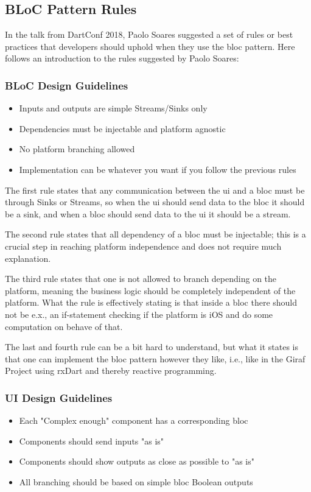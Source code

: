 \subsection{BLoC Pattern Rules}
In the talk from DartConf 2018, Paolo Soares suggested a set of rules or best practices that developers should uphold when they use the \gls{bloc} pattern. Here follows an introduction to the rules suggested by Paolo Soares:

\subsubsection{BLoC Design Guidelines}
\begin{itemize}
  \item Inputs and outputs are simple Streams/Sinks only
  \item Dependencies must be injectable and platform agnostic
  \item No platform branching allowed
  \item Implementation can be whatever you want if you follow the previous rules
\end{itemize}

The first rule states that any communication between the \gls{ui} and a \gls{bloc} must be through Sinks or Streams, so when the \gls{ui} should send data to the \gls{bloc} it should be a sink, and when a \gls{bloc} should send data to the \gls{ui} it should be a stream.

The second rule states that all dependency of a \gls{bloc} must be injectable; this is a crucial step in reaching platform independence and does not require much explanation.

The third rule states that one is not allowed to branch depending on the platform, meaning the business logic should be completely independent of the platform. What the rule is effectively stating is that inside a \gls{bloc} there should not be e.x., an if-statement checking if the platform is iOS and do some computation on behave of that.

The last and fourth rule can be a bit hard to understand, but what it states is that one can implement the \gls{bloc} pattern however they like, i.e., like in the Giraf Project using rxDart and thereby reactive programming.

\subsubsection{UI Design Guidelines}
\begin{itemize}
  \item Each "Complex enough" component has a corresponding \gls{bloc}
  \item Components should send inputs "as is"
  \item Components should show outputs as close as possible to "as is"
  \item All branching should be based on simple \gls{bloc} Boolean outputs
\end{itemize}

